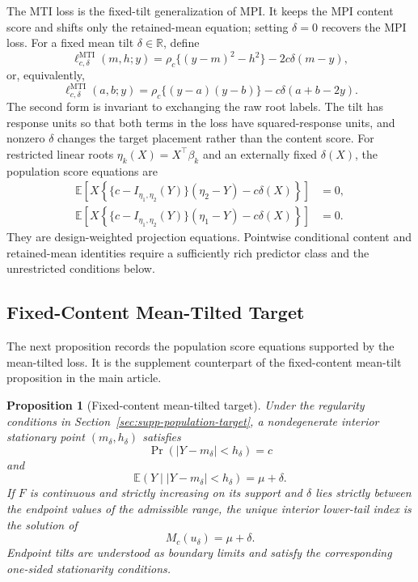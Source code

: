\documentclass[11pt]{article}
\newcommand{\R}{\mathbb{R}}
\newcommand{\E}{\mathbb{E}}
\newtheorem{proposition}{Proposition}
\begin{document}
The MTI loss is the fixed-tilt generalization of MPI. It keeps the MPI content
score and shifts only the retained-mean equation; setting \(\delta=0\) recovers
the MPI loss. For a fixed mean tilt \(\delta\in\R\), define
\begin{equation}
\ell_{c,\delta}^{\mathrm{MTI}}(m,h;y)
=\rho_c\{(y-m)^2-h^2\}-2c\delta(m-y),
\label{eq:mean-tilted-loss-midpoint}
\end{equation}
or, equivalently,
\begin{equation}
\ell_{c,\delta}^{\mathrm{MTI}}(a,b;y)
=\rho_c\{(y-a)(y-b)\}-c\delta(a+b-2y).
\label{eq:mean-tilted-loss-roots}
\end{equation}
The second form is invariant to exchanging the raw root labels. The tilt has
response units so that both terms in the loss have squared-response units, and
nonzero \(\delta\) changes the target placement rather than the content score.
For restricted linear roots \(\eta_k(X)=X^\top\beta_k\) and an externally
fixed \(\delta(X)\), the population score equations are
\begin{align}
\E\!\left[
X\left\{\{c-I_{\eta_1,\eta_2}(Y)\}(\eta_2-Y)-c\delta(X)\right\}
\right]&=0,\\
\E\!\left[
X\left\{\{c-I_{\eta_1,\eta_2}(Y)\}(\eta_1-Y)-c\delta(X)\right\}
\right]&=0.
\end{align}
They are design-weighted projection equations. Pointwise conditional content
and retained-mean identities require a sufficiently rich predictor class and
the unrestricted conditions below.

\subsection{Fixed-Content Mean-Tilted Target}

The next proposition records the population score equations supported by the
mean-tilted loss. It is the supplement counterpart of
the fixed-content mean-tilt proposition in the main article.

\begin{proposition}[Fixed-content mean-tilted target]
\label{prop:supp-mean-tilt}
Under the regularity conditions in
Section~\ref{sec:supp-population-target}, a nondegenerate interior
stationary point \((m_\delta,h_\delta)\) satisfies
\[
\Pr(|Y-m_\delta|<h_\delta)=c
\]
and
\[
\E(Y\mid |Y-m_\delta|<h_\delta)=\mu+\delta.
\]
If \(F\) is continuous and strictly increasing on its support and \(\delta\)
lies strictly between the endpoint values of the admissible range, the unique
interior lower-tail index is the solution of
\[
M_c(u_\delta)=\mu+\delta.
\]
Endpoint tilts are understood as boundary limits and satisfy the corresponding
one-sided stationarity conditions.
\end{proposition}
\end{document}
